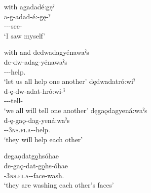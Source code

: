 \newpage
\ea\label{ex:rflsrfex2} with  \textsc{}
\ea agadadé:gęˀ\\
\gll a-g-adad-é:-gę-ˀ\\
 {\factual}--{\joinerE}-see-{\punctual}\\
\glt `I saw myself'
\z
\z

\ea\label{ex:rflsrfex3} with  \textsc{\dualic} and  \textsc{\reciprocal}
\ea dedwadagyénawaˀs\\
\gll de-dw-adag-yénawaˀs\\
 {\dualic}--{}-help.{\noaspect}\\
\glt `let us all help one another'
\ex dędwadatró:wiˀ\\
\gll d-ę-dw-adat-hró:wi-ˀ\\
 {\dual}--{}-tell-{\punctual}\\
\glt `we all will tell one another'
\ex dęgaǫdagyená:waˀs\\
\gll d-ę-gaǫ-dag-yená:waˀs\\
 {\dualic}-{\future}-\textsc{3ns.fi.a}-{}-help.{\zeropunctual}\\
\glt `they will help each other'

\newpage

\ex degaǫdatgǫ̱hsóhae\\
\gll de-gaǫ-dat-gǫ̱hs-óhae\\
{\dual}-\textsc{3ns.fi.a}-{}-face-wash.{\stative}\\
\glt ‘they are washing each other’s faces’

